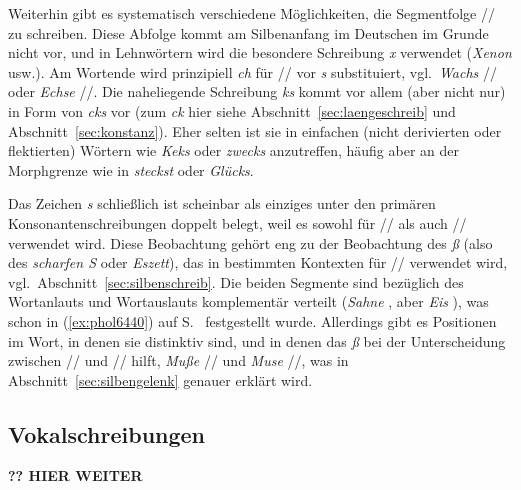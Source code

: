 Weiterhin gibt es systematisch verschiedene Möglichkeiten, die Segmentfolge // zu schreiben.
Diese Abfolge kommt am Silbenanfang im Deutschen im Grunde nicht vor, und in Lehnwörtern wird die besondere Schreibung \textit{x} verwendet (\textit{Xenon} usw.).
Am Wortende wird prinzipiell \textit{ch} für // vor \textit{s} substituiert, vgl.\ \textit{Wachs} // oder \textit{Echse} //.
Die naheliegende Schreibung \textit{ks} kommt vor allem (aber nicht nur) in Form von \textit{cks} vor (zum \textit{ck} hier siehe Abschnitt~\ref{sec:laengeschreib} und Abschnitt~\ref{sec:konstanz}).
Eher selten ist sie in einfachen (nicht derivierten oder flektierten) Wörtern wie \textit{Keks} oder \textit{zwecks} anzutreffen, häufig aber an der Morphgrenze wie in \textit{steckst} oder \textit{Glücks}.

Das Zeichen \textit{s} schließlich ist scheinbar als einziges unter den primären Konsonantenschreibungen doppelt belegt, weil es sowohl für // als auch // verwendet wird.
Diese Beobachtung gehört eng zu der Beobachtung des \textit{ß} (also des \textit{scharfen S} oder \textit{Eszett}), das in bestimmten Kontexten für // verwendet wird, vgl.\ Abschnitt~\ref{sec:silbenschreib}.
Die beiden Segmente sind bezüglich des Wortanlauts und Wortauslauts komplementär verteilt (\textit{Sahne} \textipa{[za:n@]}, aber \textit{Eis} \textipa{[P\t{aE}s]}), was schon in (\ref{ex:phol6440}) auf S.~\pageref{ex:phol6440} festgestellt wurde.
Allerdings gibt es Positionen im Wort, in denen sie distinktiv sind, und in denen das \textit{ß} bei der Unterscheidung zwischen // und // hilft, \zB \textit{Muße} // und \textit{Muse} //, was in Abschnitt~\ref{sec:silbengelenk} genauer erklärt wird.


\subsection{Vokalschreibungen}

\textbf{?? HIER WEITER}

